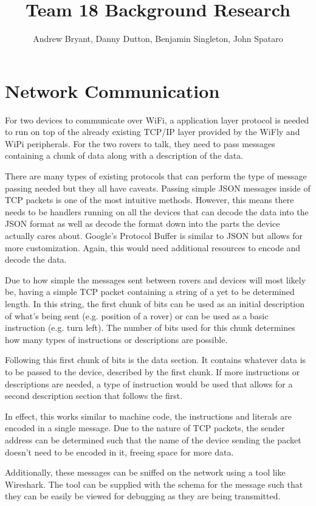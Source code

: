 \documentclass[12pt,letterpaper]{article}
\author{Andrew Bryant, Danny Dutton, Benjamin Singleton, John Spataro}
\title{Team 18 Background Research}
\begin{document}
\maketitle

\section{Network Communication}
For two devices to communicate over WiFi, a application layer protocol is needed to run on top of the already existing TCP/IP layer provided by the WiFly and WiPi peripherals. For the two rovers to talk, they need to pass messages containing a chunk of data along with a description of the data. 

There are many types of existing protocols that can perform the type of message passing needed but they all have caveats. Passing simple JSON messages inside of TCP packets is one of the most intuitive methods. However, this means there needs to be handlers running on all the devices that can decode the data into the JSON format as well as decode the format down into the parts the device actually cares about. Google's Protocol Buffer is similar to JSON but allows for more customization. Again, this would need additional resources to encode and decode the data.

Due to how simple the messages sent between rovers and devices will most likely be, having a simple TCP packet containing a string of a yet to be determined length.  In this string, the first chunk of bits can be used as an initial description of what's being sent (e.g. position of a rover) or can be used as a basic instruction (e.g. turn left). The number of bits used for this chunk determines how many types of instructions or descriptions are possible.

Following this first chunk of bits is the data section. It contains whatever data is to be passed to the device, described by the first chunk. If more instructions or descriptions are needed, a type of instruction would be used that allows for a second description section that follows the first.

In effect, this works similar to machine code, the instructions and literals are encoded in a single message. Due to the nature of TCP packets, the sender address can be determined such that the name of the device sending the packet doesn't need to be encoded in it, freeing space for more data.

Additionally, these messages can be sniffed on the network using a tool like Wireshark. The tool can be supplied with the schema for the message such that they can be easily be viewed for debugging as they are being transmitted.
\end{document}
